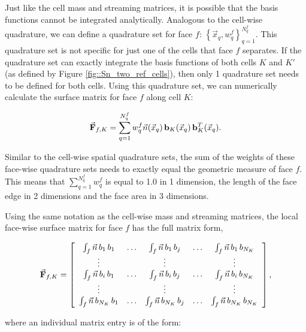 Just like the cell mass and streaming matrices, it is possible that the basis functions cannot be integrated analytically. Analogous to the cell-wise quadrature, we can define a quadrature set for face $f$: $\left\{  \vec{x}_q , w_q^{f}  \right\}_{q=1}^{N_q^f}$. This quadrature set is not specific for just one of the cells that face $f$ separates. If the quadrature set can exactly integrate the basis functions of both cells $K$ and $K'$ (as defined by Figure \ref{fig::Sn_two_ref_cells}), then only 1 quadrature set needs to be defined for both cells. Using this quadrature set, we can numerically calculate the surface matrix for face $f$ along cell $K$:

\begin{equation}
\label{eq::Sn_surface_matrix_numerical}
\vec{{\bf F}}_{f,K} =    \sum_{q = 1}^{N_q^f} w_{q}^f \vec{n} (\vec{x}_q) \, {\bf b}_K (\vec{x}_q) \, {\bf b}_K^T (\vec{x}_q) .
\end{equation}

\noindent Similar to the cell-wise spatial quadrature sets, the sum of the weights of these face-wise quadrature sets needs to exactly equal the geometric measure of face $f$. This means that $\sum_{q = 1}^{N_q^f} w_{q}^f$ is equal to 1.0 in 1 dimension, the length of the face edge in 2 dimensions and the face area in 3 dimensions. 

Using the same notation as the cell-wise mass and streaming matrices, the local face-wise surface matrix for face $f$ has the full matrix form,

\begin{equation}
\label{eq::Sn_surface_matrix_array}
\vec{{\bf F}}_{f,K} =   \left[
\begin{array} {ccccc}
	\int_f \vec{n} \, b_1 \, b_1  & \ldots & \int_f \vec{n} \, b_1 \, b_j  & \ldots & \int_f \vec{n} \, b_1 \, b_{N_K} \\
	\vdots  &  & \vdots  &  & \vdots \\
	\int_f \vec{n} \,  b_i \, b_1  & \ldots & \int_f \vec{n} \, b_i \, b_j  & \ldots & \int_f \vec{n} \, b_i \, b_{N_K} \\
	\vdots  &  & \vdots  &  & \vdots \\
	\int_f \vec{n} \,  b_{N_K} \, b_1  & \ldots & \int_f \vec{n} \,  b_{N_K} \, b_j  & \ldots & \int_f \vec{n} \,  b_{N_K} \, b_{N_K} \\
\end{array}
\right] ,
\end{equation}

\noindent where an individual matrix entry is of the form:

